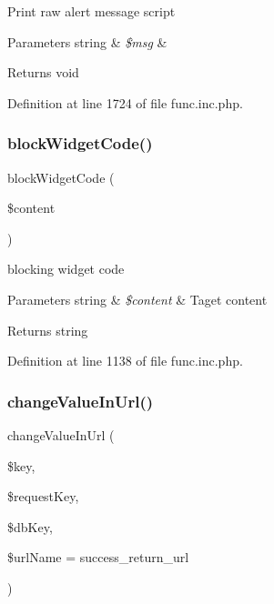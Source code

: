 Print raw alert message script


\begin{DoxyParams}[1]{Parameters}
string & {\em \$msg} & \\
\hline
\end{DoxyParams}
\begin{DoxyReturn}{Returns}
void 
\end{DoxyReturn}


Definition at line 1724 of file func.\+inc.\+php.

\mbox{\label{func_8inc_8php_a3e4480709a0bb53f6478ae6521cda6f3}} 
\subsubsection{\texorpdfstring{block\+Widget\+Code()}{blockWidgetCode()}}
{\footnotesize\ttfamily block\+Widget\+Code (\begin{DoxyParamCaption}\item[{}]{\$content }\end{DoxyParamCaption})}

blocking widget code


\begin{DoxyParams}[1]{Parameters}
string & {\em \$content} & Taget content \\
\hline
\end{DoxyParams}
\begin{DoxyReturn}{Returns}
string 
\end{DoxyReturn}


Definition at line 1138 of file func.\+inc.\+php.

\mbox{\label{func_8inc_8php_a803ae4f2d5437f4bad33bf4b5d20c627}} 
\subsubsection{\texorpdfstring{change\+Value\+In\+Url()}{changeValueInUrl()}}
{\footnotesize\ttfamily change\+Value\+In\+Url (\begin{DoxyParamCaption}\item[{}]{\$key,  }\item[{}]{\$request\+Key,  }\item[{}]{\$db\+Key,  }\item[{}]{\$url\+Name = {\ttfamily \textquotesingle{}success\+\_\+return\+\_\+url\textquotesingle{}} }\end{DoxyParamCaption})}



